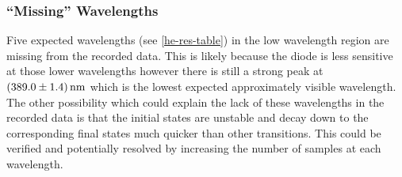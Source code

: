 \documentclass[10pt, twocolumn]{article}
\theoremstyle{definition}
\begin{document}
\subsubsection{``Missing'' Wavelengths}
Five expected wavelengths (see \ref{he-res-table}) in the low wavelength region are missing from the recorded data.
This is likely because the diode is less sensitive at those lower wavelengths\autocite{diode-manufacturer} however there is
still a strong peak at $\qty{389\pm1.4}{\nano\meter}$ which is the lowest expected approximately visible wavelength.
The other possibility which could explain the lack of these wavelengths in the recorded data is that the initial states
are unstable and decay down to the corresponding final states much quicker than other transitions. This could be verified
and potentially resolved by increasing the number of samples at each wavelength.
\end{document}
